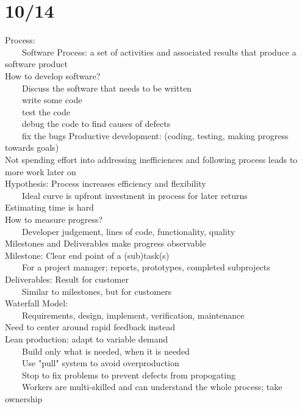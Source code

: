 \documentclass[10pt,letterpaper,unboxed,cm]{article}
\newcommand{\tab}{~~~~}
\begin{document}
\section{10/14}
Process: \\
\tab Software Process: a set of activities and associated results that produce a software product\\
How to develop software?\\
\tab Discuss the software that needs to be written\\
\tab write some code\\
\tab test the code\\
\tab debug the code to find causes of defects\\
\tab fix the bugs
Productive development: (coding, testing, making progress towards goals)\\
Not spending effort into addressing inefficiences and following process leads to more work later on\\
Hypothesis: Process increases efficiency and flexibility\\
\tab Ideal curve is upfront investment in process for later returns\\
Estimating time is hard\\
How to measure progress?\\
\tab Developer judgement, lines of code, functionality, quality\\
Milestones and Deliverables make progress observable\\
Milestone: Clear end point of a (sub)task(s)\\
\tab For a project manager; reports, prototypes, completed subprojects\\
Deliverables: Result for customer\\
\tab Similar to milestones, but for customers\\
Waterfall Model: \\
\tab Requirements, design, implement, verification, maintenance\\
Need to center around rapid feedback instead\\
Lean production: adapt to variable demand\\
\tab Build only what is needed, when it is needed\\
\tab Use "pull" system to avoid overproduction\\
\tab Stop to fix problems to prevent defects from propogating\\
\tab Workers are multi-skilled and can understand the whole process; take ownership\\
\end{document}
